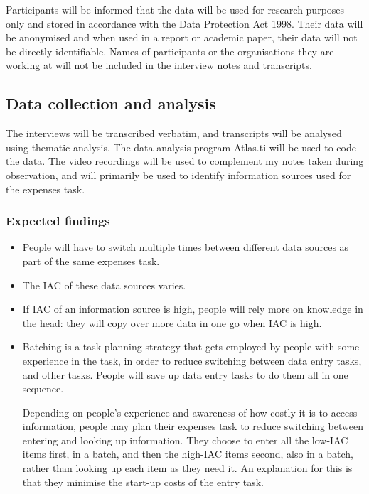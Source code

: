 \documentclass[11pt,oneside]{report}
\begin{document}
Participants will be informed that the data will be used for research purposes only and stored in accordance with the Data Protection Act 1998. Their data will be anonymised and when used in a report or academic paper, their data will not be directly identifiable. Names of participants or the organisations they are working at will not be included in the interview notes and transcripts.


\subsection{Data collection and analysis}
The interviews will be transcribed verbatim, and transcripts will be analysed using thematic analysis. The data analysis program Atlas.ti will be used to code the data. The video recordings will be used to complement my notes taken during observation, and will primarily be used to identify information sources used for the expenses task. 

\subsubsection{Expected findings}
\begin{itemize}
\item
People will have to switch multiple times between different data sources as part of the same expenses task.
\item
The IAC of these data sources varies. 
\item
If IAC of an information source is high, people will rely more on knowledge in the head: they will copy over more data in one go when IAC is high.
\item
Batching is a task planning strategy that gets employed by people with some experience in the task, in order to reduce switching between data entry tasks, and other tasks.  People will save up data entry tasks to do them all in one sequence.

Depending on people's experience and awareness of how costly it is to access information, people may plan their expenses task to reduce switching between entering and looking up information. They choose to enter all the low-IAC items first, in a batch, and then the high-IAC items second, also in a batch, rather than looking up each item as they need it.  An explanation for this is that they minimise the start-up costs of the entry task.

\end{itemize}
\end{document}
